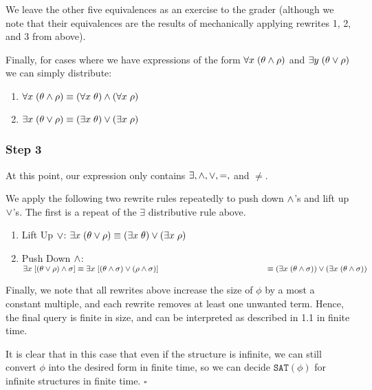 \documentclass{article}
\newcommand{\qed}{\hfill$\square$}
\begin{document}
\bigskip

We leave the other five equivalences as an exercise to the grader (although we
note that their equivalences are the results of mechanically applying rewrites
1, 2, and 3 from above).


Finally, for cases where we have expressions of the form $\forall x \; (\theta
\wedge \rho)$ and $\exists y \; (\theta \vee \rho)$ we can simply distribute:

\begin{enumerate}[label = {-}, itemsep=0mm]
  \item $\forall x \; (\theta \wedge \rho) \equiv (\forall x \; \theta) \wedge (\forall x \; \rho)$
  \item $\exists x \; (\theta \vee \rho) \equiv (\exists x \; \theta) \vee (\exists x \; \rho)$
\end{enumerate}

\subsubsection{Step 3}

At this point, our expression only contains $\exists, \wedge, \vee, =,$ and
$\neq$.

We apply the following two rewrite rules repeatedly to push down $\wedge$'s and
lift up $\vee$'s. The first is a repeat of the $\exists$ distributive rule
above.

\begin{enumerate}[label = {\alph*)}]
    \item Lift Up $\vee$: $\exists x \; (\theta \vee \rho) \equiv (\exists x \; \theta) \vee (\exists x \; \rho)$
    \item Push Down $\wedge$: $\exists x \; [(\theta \OR \rho) \AND \sigma] \equiv \exists x \; [(\theta \AND \sigma) \OR (\rho \AND \sigma)]
        \\ \hspace*{47mm} \equiv (\exists x \; (\theta \AND \sigma)) \OR (\exists x \; (\theta \AND \sigma))$
\end{enumerate}

Finally, we note that all rewrites above increase the size of $\phi$ by a most
a constant multiple, and each rewrite removes at least one unwanted term.
Hence, the final query is finite in size, and can be interpreted as described
in 1.1 in finite time.

It is clear that in this case that even if the structure is infinite, we can
still convert $\phi$ into the desired form in finite time, so we can decide
$\texttt{SAT}(\phi)$ for infinite structures in finite time. \qed
\end{document}
